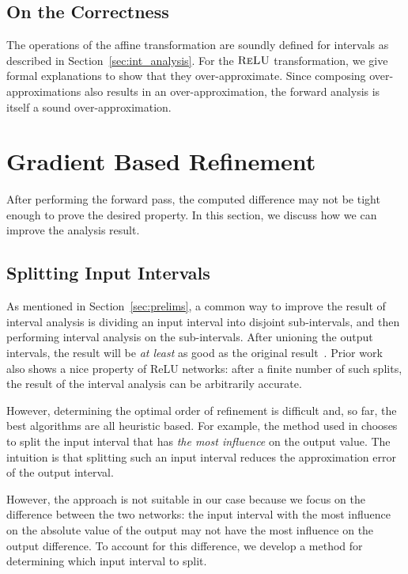 \subsection{On the Correctness}
The operations of the affine transformation are soundly defined for intervals as
described in Section~\ref{sec:int_analysis}. For the $ \textsc{ReLU} $
transformation, we give formal explanations to show that they over-approximate.
Since composing over-approximations also results in an over-approximation,
the forward analysis is itself a sound over-approximation.


\section{Gradient Based Refinement}
\label{sec:backward-pass}

After performing the forward pass, the computed difference may not be
tight enough to prove the desired property. In this section, we
discuss how we can improve the analysis result.

\subsection{Splitting Input Intervals}

As mentioned in Section~\ref{sec:prelims}, a common way to improve the
result of interval analysis is dividing an input interval into
disjoint sub-intervals, and then performing interval analysis on the
sub-intervals.
%
After unioning the output intervals, the result will be \textit{at
least} as good as the original result~\cite{moore2009introduction}.
Prior work~\cite{WangPWYJ18} also shows a nice property of ReLU
networks: after a finite number of such splits, the result of the interval
analysis can be arbitrarily accurate.


However, determining the optimal order of refinement  is difficult and,
so far, the best algorithms are all heuristic based. For example, the
method used in \ReluVal{} chooses to split the input interval that has
\emph{the most influence} on the output value.
The intuition is that splitting such an input interval reduces the
approximation error of the output interval.


However, the approach is not suitable in our case because we focus on
the difference between the two networks: the input interval with the most
influence on the absolute value of the output may not have the most
influence on the output difference.  To account for this difference,
we develop a method for determining which input interval to split.


